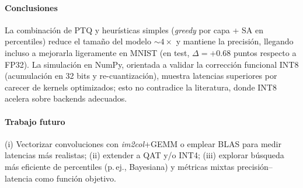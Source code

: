 \paragraph{Conclusiones}
La combinación de PTQ y heurísticas simples (\emph{greedy} por capa + SA en percentiles) reduce el tamaño del modelo $\sim 4\times$ y mantiene la precisión, llegando incluso a mejorarla ligeramente en MNIST (en test, $\Delta=+0.68$ puntos respecto a FP32). La simulación en NumPy, orientada a validar la corrección funcional INT8 (acumulación en 32 bits y re-cuantización), muestra latencias superiores por carecer de kernels optimizados; esto no contradice la literatura, donde INT8 acelera sobre backends adecuados.

\paragraph{Trabajo futuro}
(i) Vectorizar convoluciones con \emph{im2col}+GEMM o emplear BLAS para medir latencias más realistas; (ii) extender a QAT y/o INT4; (iii) explorar búsqueda más eficiente de percentiles (p.\,ej., Bayesiana) y métricas mixtas precisión–latencia como función objetivo.

